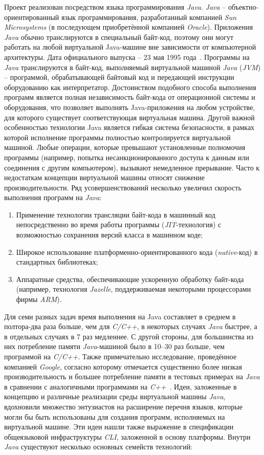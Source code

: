 Проект реализован посредством языка программирования \textit{Java}. \textit{Java} – объектно-ориентированный язык программирования, разработанный компанией \textit{Sun Microsystems} (в последующем приобретённой компанией \textit{Oracle}). Приложения \textit{Java} обычно транслируются в специальный байт-код, поэтому они могут работать на любой виртуальной Java-машине вне зависимости от компьютерной архитектуры. Дата официального выпуска – 23 мая 1995 года~\cite{java}.
Программы на \textit{Java} транслируются в байт-код, выполняемый виртуальной машиной \textit{Java} (\textit{JVM}) – программой, обрабатывающей байтовый код и передающей инструкции оборудованию как интерпретатор.
Достоинством подобного способа выполнения программ является полная независимость байт-кода от операционной системы и оборудования, что позволяет выполнять Java-приложения на любом устройстве, для которого существует соответствующая виртуальная машина. Другой важной особенностью технологии Java является гибкая система безопасности, в рамках которой исполнение программы полностью контролируется виртуальной машиной. Любые операции, которые превышают установленные полномочия программы (например, попытка несанкционированного доступа к данным или соединения с другим компьютером), вызывают немедленное прерывание.
Часто к недостаткам концепции виртуальной машины относят снижение производительности. Ряд усовершенствований несколько увеличил скорость выполнения программ на \textit{Java}:

\begin{enumerate}
	\item Применение технологии трансляции байт-кода в машинный код непосредственно во время работы программы (\textit{JIT}-технология) с возможностью сохранения версий класса в машинном коде;
	\item Широкое использование платформенно-ориентированного кода (\textit{native}-код) в стандартных библиотеках;
	\item Аппаратные средства, обеспечивающие ускоренную обработку байт-кода (например, технология \textit{Jazelle}, поддерживаемая некоторыми процессорами фирмы \textit{ARM}).
\end{enumerate}

Для семи разных задач время выполнения на Java составляет в среднем в полтора-два раза больше, чем для \textit{C/C++}, в некоторых случаях \textit{Java} быстрее, а в отдельных случаях в 7 раз медленнее. С другой стороны, для большинства из них потребление памяти \textit{Java}-машиной было в 10–30 раз больше, чем программой на \textit{C/C++}. Также примечательно исследование, проведённое компанией \textit{Google}, согласно которому отмечается существенно более низкая производительность и большее потребление памяти в тестовых примерах на \textit{Java} в сравнении с аналогичными программами на \textit{C++}~\cite{java}.
Идеи, заложенные в концепцию и различные реализации среды виртуальной машины \textit{Java}, вдохновили множество энтузиастов на расширение перечня языков, которые могли бы быть использованы для создания программ, исполняемых на виртуальной машине. Эти идеи нашли также выражение в спецификации общеязыковой инфраструктуры \textit{CLI}, заложенной в основу платформы. Внутри \textit{Java} существуют несколько основных семейств технологий:

